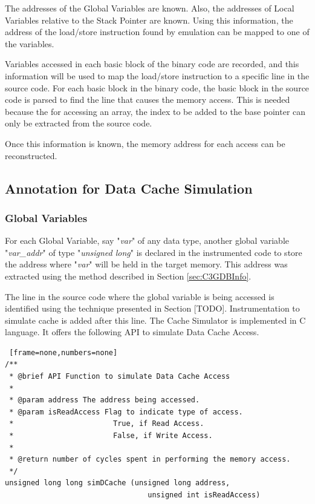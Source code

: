 The addresses of the Global Variables are known. Also, the addresses of Local Variables relative to the Stack Pointer are known. Using this information, the address of the load/store instruction found by emulation can be mapped to one of the variables.

Variables accessed in each basic block of the binary code are recorded, and this information will be used to map the load/store instruction to a specific line in the source code. For each basic block in the binary code, the basic block in the source code is parsed to find the line that causes the memory access. This is needed because the for accessing an array, the index to be added to the base pointer can only be extracted from the source code. 

Once this information is known, the memory address for each access can be reconstructed.

\subsection{Annotation for Data Cache Simulation}
\subsubsection{Global Variables}
For each Global Variable, say "\textit{var}" of any data type, another global variable "\textit{var\_addr}" of type "\textit{unsigned long}" is declared in the instrumented code to store the address where "\textit{var}" will be held in the target memory. This address was extracted using the method described in Section \ref{sec:C3GDBInfo}.

The line in the source code where the global variable is being accessed is identified using the technique presented in Section [TODO]. Instrumentation to simulate cache is added after this line. The Cache Simulator is implemented in C language. It offers the following API to simulate Data Cache Access.

\begin{lstlisting} [frame=none,numbers=none]
/**
 * @brief API Function to simulate Data Cache Access
 * 
 * @param address The address being accessed.
 * @param isReadAccess Flag to indicate type of access.
 * 					     True, if Read Access.
 * 					     False, if Write Access.
 *
 * @return number of cycles spent in performing the memory access.
 */ 
unsigned long long simDCache (unsigned long address, 
							     unsigned int isReadAccess)
\end{lstlisting}

